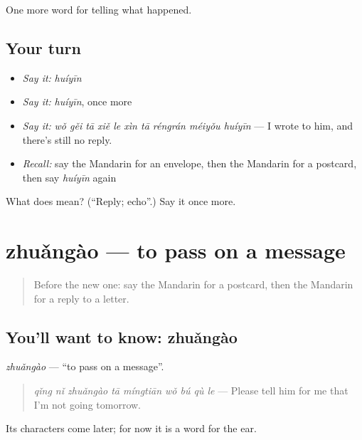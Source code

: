 \begin{grammarlens}[title={What you've built}]
One more word for telling what happened.
\end{grammarlens}

\subsection*{Your turn}
\begin{itemize}
\raggedright
  \item \emph{Say it:} \emph{huíyīn}
  \item \emph{Say it:} \emph{huíyīn}, once more
  \item \emph{Say it:} \emph{wǒ gěi tā xiě le xìn tā réngrán méiyǒu huíyīn} — I wrote to him, and there's still no reply.
  \item \emph{Recall:} say the Mandarin for an envelope, then the Mandarin for a postcard, then say \emph{huíyīn} again
\end{itemize}

\begin{tcolorbox}[breakable,colback=teal!4,colframe=teal!35!black,title={Before you move on}]
What does  mean? (\textquotedblleft{}Reply; echo\textquotedblright{}.) Say it once more.
\end{tcolorbox}
\section[zhuǎngào]{zhuǎngào — to pass on a message}

\label{lesson:ZH-C318-zhuangao}



\begin{quote}
Before the new one: say the Mandarin for a postcard, then the Mandarin for a reply to a letter.
\end{quote}

\subsection*{You'll want to know: zhuǎngào}
\emph{zhuǎngào} — \textquotedblleft{}to pass on a message\textquotedblright{}.

\begin{quote}
\emph{qǐng nǐ zhuǎngào tā míngtiān wǒ bú qù le} — Please tell him for me that I'm not going tomorrow.
\end{quote}

Its characters come later; for now it is a word for the ear.


